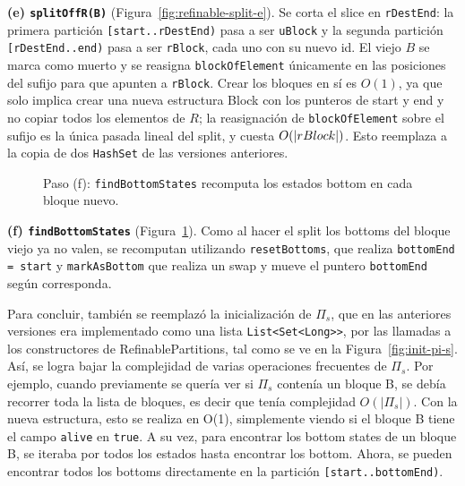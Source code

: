 \textbf{(e) \textbf{\texttt{splitOffR(B)}}} (Figura~\ref{fig:refinable-split-e}). Se corta el slice en \texttt{rDestEnd}: la primera partición \texttt{[start..rDestEnd)} pasa a ser \texttt{uBlock} y la segunda partición \texttt{[rDestEnd..end)} pasa a ser \texttt{rBlock}, cada uno con su nuevo id. El viejo $B$ se marca como muerto y se reasigna \texttt{blockOfElement} únicamente en las posiciones del sufijo para que apunten a \texttt{rBlock}. Crear los bloques en sí es $O(1)$, ya que solo implica crear una nueva estructura Block con los punteros de start y end y no copiar todos los elementos de $R$; la reasignación de \texttt{blockOfElement} sobre el sufijo es la única pasada lineal del split, y cuesta $O(\left\lvert rBlock \right\rvert)$. Esto reemplaza a la copia de dos \texttt{HashSet} de las versiones anteriores.

\begin{figure}[h]
\centering
{}
\caption[]{Paso (f): \texttt{findBottomStates} recomputa los estados bottom en cada bloque nuevo.}
\label{fig:refinable-split-f}
\end{figure}

\textbf{(f) \textbf{\texttt{findBottomStates}}} (Figura~\ref{fig:refinable-split-f}). Como al hacer el split los bottoms del bloque viejo ya no valen, se recomputan utilizando \texttt{resetBottoms}, que realiza \texttt{bottomEnd = start} y \texttt{markAsBottom} que realiza un swap y mueve el puntero \texttt{bottomEnd} según corresponda.

Para concluir, también se reemplazó la inicialización de $\Pi_s$, que en las anteriores versiones era implementado como una lista \texttt{List<Set<Long>>}, por las llamadas a los constructores de RefinablePartitions, tal como se ve en la Figura~\ref{fig:init-pi-s}. Así, se logra bajar la complejidad de varias operaciones frecuentes de $\Pi_s$. Por ejemplo, cuando previamente se quería ver si $\Pi_s$ contenía un bloque B, se debía recorrer toda la lista de bloques, es decir que tenía complejidad $O(|\Pi_s|)$. Con la nueva estructura, esto se realiza en O(1), simplemente viendo si el bloque B tiene el campo \texttt{alive} en \texttt{true}. A su vez, para encontrar los bottom states de un bloque B, se iteraba por todos los estados hasta encontrar los bottom. Ahora, se pueden encontrar todos los bottoms directamente en la partición \texttt{[start..bottomEnd)}.

